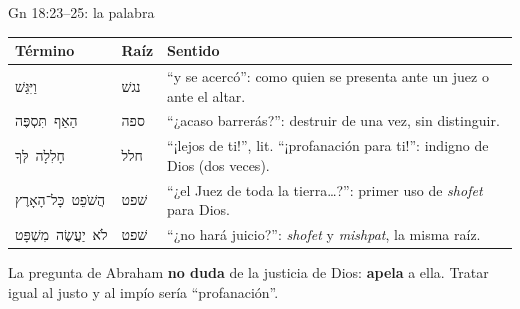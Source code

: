 \documentclass[hyperref={bookmarks=false},aspectratio=169]{beamer}
\newcommand{\heb}[1]{\mbox{\foreignlanguage{hebrew}{#1}}}
\newcommand{\destacar}[1]{\textbf{\textcolor{azul}{#1}}}
\begin{document}
\begin{frame}{Gn 18:23--25: la palabra}
\scriptsize\renewcommand{\arraystretch}{1.15}
\begin{tabular}{@{}>{\RaggedRight\arraybackslash}p{2.8cm}>{\RaggedRight\arraybackslash}p{1.1cm}>{\RaggedRight\arraybackslash}p{8.0cm}@{}}
\toprule
\textbf{Término} & \textbf{Raíz} & \textbf{Sentido} \\ \midrule
\heb{וַיִּגַּשׁ} & \heb{נגשׁ} & ``y se acercó'': como quien se presenta ante un juez o ante el altar. \\
\heb{הַאַף תִּסְפֶּה} & \heb{ספה} & ``¿acaso barrerás?'': destruir de una vez, sin distinguir. \\
\heb{חָלִלָה לְּךָ} & \heb{חלל} & ``¡lejos de ti!'', lit. ``¡profanación para ti!'': indigno de Dios (dos veces). \\
\heb{הֲשֹׁפֵט כָּל־הָאָרֶץ} & \heb{שׁפט} & ``¿el Juez de toda la tierra\ldots?'': primer uso de \emph{shofet} para Dios. \\
\heb{לֹא יַעֲשֶׂה מִשְׁפָּט} & \heb{שׁפט} & ``¿no hará juicio?'': \emph{shofet} y \emph{mishpat}, la misma raíz. \\
\bottomrule
\end{tabular}\par\medskip
\small La pregunta de Abraham \destacar{no duda} de la justicia de Dios: \destacar{apela} a ella. Tratar igual al justo y al impío sería ``profanación''.
\end{frame}
\end{document}
